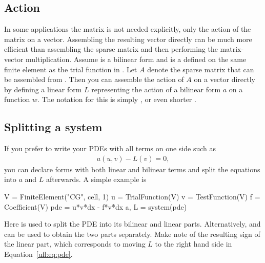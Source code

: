 \subsection{Action}
\label{ufl:sec:action}
In some applications the matrix is not needed explicitly, only the
action of the matrix on a vector. Assembling the resulting vector
directly can be much more efficient than assembling the sparse matrix
and then performing the matrix-vector multiplication.
Assume  is a bilinear form and 
is a  defined on the same finite
element as the trial function in .
Let $A$ denote the sparse matrix that can be assembled
from . Then you can assemble the action of
$A$ on a vector directly by defining a linear form $L$
representing the action of a bilinear form $a$ on a function $w$.
The notation for this is simply ,
or even shorter .


\subsection{Splitting a system}
\label{ufl:sec:system}

If you prefer to write your PDEs with all terms on one side such as
\begin{align}\label{ufl:eq:pde}
a(u, v) - L(v) = 0,
\end{align}
you can declare forms with both linear and bilinear terms
and split the equations into $a$ and $L$ afterwards.
A simple example is
\begin{python}
V = FiniteElement("CG", cell, 1)
u = TrialFunction(V)
v = TestFunction(V)
f = Coefficient(V)
pde = u*v*dx - f*v*dx
a, L = system(pde)
\end{python}
Here  is used to split the PDE into its bilinear and
linear parts. Alternatively,  and  can be used
to obtain the two parts separately. Make note of the resulting sign
of the linear part, which corresponds to moving $L$ to the right
hand side in Equation~\eqref{ufl:eq:pde}.

